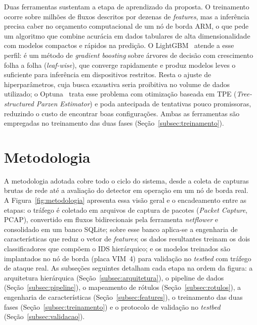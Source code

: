\documentclass[12pt]{article}
\begin{document}
Duas ferramentas sustentam a etapa de aprendizado da proposta. O treinamento
ocorre sobre milhões de fluxos descritos por dezenas de \textit{features}, mas a
inferência precisa caber no orçamento computacional de um nó de borda ARM, o que
pede um algoritmo que combine acurácia em dados tabulares de alta
dimensionalidade com modelos compactos e rápidos na predição. O
LightGBM~\cite{ke:17} atende a esse perfil: é um método de \textit{gradient
boosting} sobre árvores de decisão com crescimento folha a folha
(\textit{leaf-wise}), que converge rapidamente e produz modelos leves o
suficiente para inferência em dispositivos restritos. Resta o ajuste de
hiperparâmetros, cuja busca exaustiva seria proibitiva no volume de dados
utilizado; o Optuna~\cite{akiba:19} trata esse problema com otimização baseada
em TPE (\textit{Tree-structured Parzen Estimator}) e poda antecipada de
tentativas pouco promissoras, reduzindo o custo de encontrar boas configurações.
Ambas as ferramentas são empregadas no treinamento das duas fases
(Seção~\ref{subsec:treinamento}).

\section{Metodologia}
\label{sec:metodologia}

A metodologia adotada cobre todo o ciclo do sistema, desde a coleta de capturas
brutas de rede até a avaliação do detector em operação em um nó de borda real.
A Figura~\ref{fig:metodologia} apresenta essa visão geral e o encadeamento entre
as etapas: o tráfego é coletado em arquivos de captura de pacotes (\textit{Packet
Capture}, PCAP), convertido em fluxos bidirecionais pela ferramenta
\textit{netflower} e consolidado em um banco SQLite; sobre esse banco aplica-se a
engenharia de características que reduz o vetor de \textit{features}; os dados
resultantes treinam os dois classificadores que compõem o IDS hierárquico; e os
modelos treinados são implantados no nó de borda (placa VIM~4) para validação no
\textit{testbed} com tráfego de ataque real. As subseções seguintes detalham cada etapa na
ordem da figura: a arquitetura hierárquica (Seção~\ref{subsec:arquitetura}), o
pipeline de dados (Seção~\ref{subsec:pipeline}), o mapeamento de rótulos
(Seção~\ref{subsec:rotulos}), a engenharia de características
(Seção~\ref{subsec:features}), o treinamento das duas fases
(Seção~\ref{subsec:treinamento}) e o protocolo de validação no \textit{testbed}
(Seção~\ref{subsec:validacao}).
\end{document}
